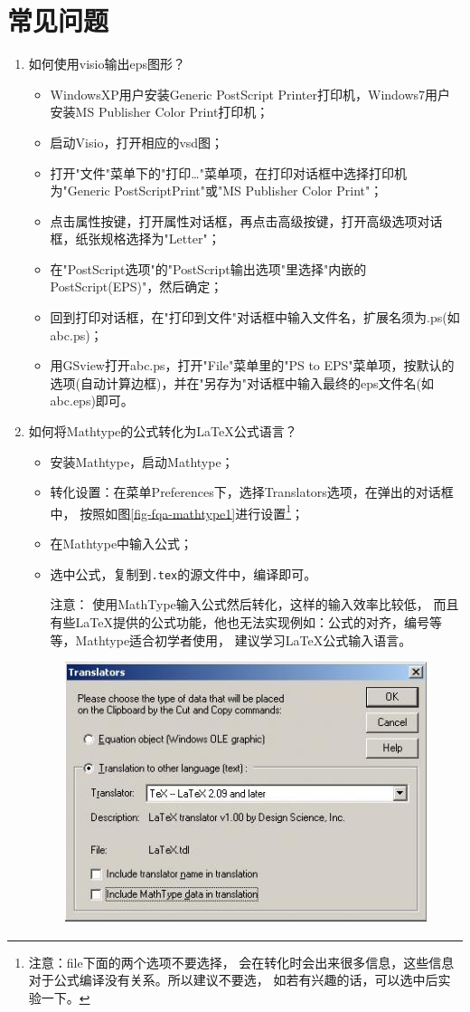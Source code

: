 \chapter{常见问题}
\label{chapter-faq}
\begin{enumerate}
\item  如何使用visio输出eps图形？
\label{visio2eps}
\begin{itemize}
	\item WindowsXP用户安装Generic PostScript Printer打印机，Windows7用户安装MS Publisher Color Print打印机；
	\item 启动Visio，打开相应的vsd图；
	\item 打开"文件"菜单下的"打印\dots "菜单项，在打印对话框中选择打印机为"Generic PostScriptPrint"或"MS Publisher Color Print"；
	\item 点击属性按键，打开属性对话框，再点击高级按键，打开高级选项对话框，纸张规格选择为"Letter"；
	\item 在"PostScript选项"的"PostScript输出选项"里选择"内嵌的PostScript(EPS)"，然后确定；
	\item 回到打印对话框，在"打印到文件"对话框中输入文件名，扩展名须为.ps(如abc.ps)；
	\item 用GSview打开abc.ps，打开"File"菜单里的"PS to EPS"菜单项，按默认的选项(自动计算边框)，并在"另存为"对话框中输入最终的eps文件名(如abc.eps)即可。
\end{itemize}
\item 如何将Mathtype的公式转化为\LaTeX{}公式语言？
\label{mathtype2latex}
\begin{itemize}
	\item 安装Mathtype，启动Mathtype；
	\item 转化设置：在菜单Preferences下，选择Translators选项，在弹出的对话框中，
按照如图\ref{fig-fqa-mathtype1}进行设置\footnote{{\heiti 注意}：file下面的两个选项不要选择，
会在转化时会出来很多信息，这些信息对于公式编译没有关系。所以建议不要选，
如若有兴趣的话，可以选中后实验一下。}；
\item 在Mathtype中输入公式；
\item 选中公式，复制到\texttt{.tex}的源文件中，编译即可。
\item[{\heiti 注意：}] 使用MathType输入公式然后转化，这样的输入效率比较低，
而且有些LaTeX提供的公式功能，他也无法实现例如：公式的对齐，编号等等，Mathtype适合初学者使用，
建议学习\LaTeX{}公式输入语言。
\end{itemize}
\begin{figure}
\begin{center}
\includegraphics[width=.7\textwidth]{figure/faq-mathtype1.jpg}

\end{center}
\end{figure}
\end{enumerate}
